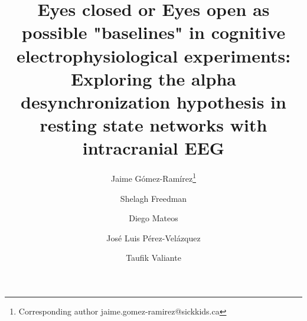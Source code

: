 \documentclass[11pt, onecolumn]{article}
\begin{document}
\def\mean#1{\left< #1 \right>}
\title{Eyes closed or Eyes open as possible "baselines" in cognitive electrophysiological experiments: Exploring the alpha desynchronization hypothesis in resting state networks with intracranial EEG}

\author[1]{Jaime G{\'o}mez-Ram{\'i}rez\thanks{Corresponding author \hspace{0.6cm} jaime.gomez-ramirez@sickkids.ca}}
\author[2]{Shelagh Freedman}%
\author[1]{Diego Mateos}
\author[1]{Jos{\'e} Luis P{\'e}rez-Vel{\'a}zquez}
\author[3]{Taufik Valiante}
\date{}

\maketitle
\end{document}
